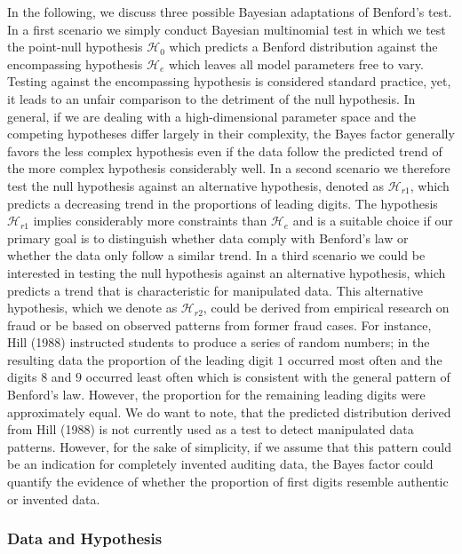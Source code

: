 \documentclass[
  english,
  man,floatsintext]{apa6}
\begin{document}
In the following, we discuss three possible Bayesian adaptations of Benford's test. In a first scenario we simply conduct Bayesian multinomial test in which we test the point-null hypothesis \(\mathcal{H}_0\) which predicts a Benford distribution against the encompassing hypothesis \(\mathcal{H}_{e}\) which leaves all model parameters free to vary. Testing against the encompassing hypothesis is considered standard practice, yet, it leads to an unfair comparison to the detriment of the null hypothesis. In general, if we are dealing with a high-dimensional parameter space and the competing hypotheses differ largely in their complexity, the Bayes factor generally favors the less complex hypothesis even if the data follow the predicted trend of the more complex hypothesis considerably well. In a second scenario we therefore test the null hypothesis against an alternative hypothesis, denoted as \(\mathcal{H}_{r1}\), which predicts a decreasing trend in the proportions of leading digits. The hypothesis \(\mathcal{H}_{r1}\) implies considerably more constraints than \(\mathcal{H}_{e}\) and is a suitable choice if our primary goal is to distinguish whether data comply with Benford's law or whether the data only follow a similar trend. In a third scenario we could be interested in testing the null hypothesis against an alternative hypothesis, which predicts a trend that is characteristic for manipulated data. This alternative hypothesis, which we denote as \(\mathcal{H}_{r2}\), could be derived from empirical research on fraud or be based on observed patterns from former fraud cases. For instance, Hill (1988) instructed students to produce a series of random numbers; in the resulting data the proportion of the leading digit \(1\) occurred most often and the digits \(8\) and \(9\) occurred least often which is consistent with the general pattern of Benford's law. However, the proportion for the remaining leading digits were approximately equal. We do want to note, that the predicted distribution derived from Hill (1988) is not currently used as a test to detect manipulated data patterns. However, for the sake of simplicity, if we assume that this pattern could be an indication for completely invented auditing data, the Bayes factor could quantify the evidence of whether the proportion of first digits resemble authentic or invented data.

\hypertarget{data-and-hypothesis}{%
\subsubsection{Data and Hypothesis}\label{data-and-hypothesis}}
\end{document}
